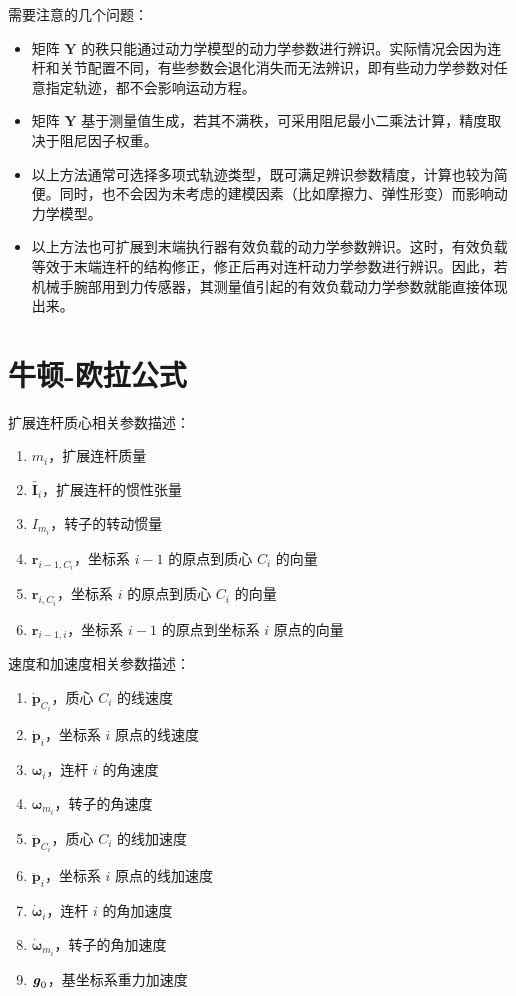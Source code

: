 \documentclass[cn,11pt,chinese,blue,bibstyle=ieeetr]{elegantbook}
\begin{document}
需要注意的几个问题：
\begin{itemize}
\item 矩阵 $\bm{Y}$ 的秩只能通过动力学模型的动力学参数进行辨识。实际情况会因为连杆和关节配置不同，有些参数会退化消失而无法辨识，即有些动力学参数对任意指定轨迹，都不会影响运动方程。
\item 矩阵 $\bm{Y}$ 基于测量值生成，若其不满秩，可采用阻尼最小二乘法计算，精度取决于阻尼因子权重。
\item 以上方法通常可选择多项式轨迹类型，既可满足辨识参数精度，计算也较为简便。同时，也不会因为未考虑的建模因素（比如摩擦力、弹性形变）而影响动力学模型。
\item 以上方法也可扩展到末端执行器有效负载的动力学参数辨识。这时，有效负载等效于末端连杆的结构修正，修正后再对连杆动力学参数进行辨识。因此，若机械手腕部用到力传感器，其测量值引起的有效负载动力学参数就能直接体现出来。
\end{itemize}


\section{牛顿-欧拉公式}

扩展连杆质心相关参数描述：
\begin{enumerate}
	\item $m_i$，扩展连杆质量
	\item $\bm{\bar{I}}_i$，扩展连杆的惯性张量
	\item $I_{m_i}$，转子的转动惯量
	\item $\bm{r}_{i-1,{C_i}}$，坐标系 $i-1$ 的原点到质心 $C_i$ 的向量
	\item $\bm{r}_{i,{C_i}}$，坐标系 $i$ 的原点到质心 $C_i$ 的向量
	\item $\bm{r}_{i-1,i}$，坐标系 $i-1$ 的原点到坐标系 $i$ 原点的向量
\end{enumerate}

速度和加速度相关参数描述：
\begin{enumerate}
	\item $\bm{\dot{p}}_{C_i}$，质心 $C_i$ 的线速度
	\item $\bm{\dot{p}}_{i}$，坐标系 $i$ 原点的线速度
	\item $\bm{\omega}_{i}$，连杆 $i$ 的角速度
	\item $\bm{\omega}_{m_i}$，转子的角速度
	\item $\bm{\ddot{p}}_{C_i}$，质心 $C_i$ 的线加速度
	\item $\bm{\ddot{p}}_{i}$，坐标系 $i$ 原点的线加速度
	\item $\bm{\dot{\omega}}_{i}$，连杆 $i$ 的角加速度
	\item $\bm{\dot{\omega}}_{m_i}$，转子的角加速度
	\item $\textbf{\textit{g}}_0$，基坐标系重力加速度
\end{enumerate}
\end{document}
